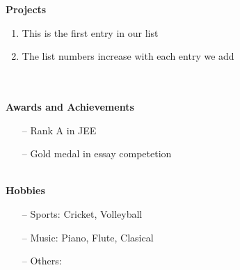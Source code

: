 \documentclass{article}
\begin{document}
\noindent \hspace*{1mm} \textbf{Projects} 
\begin{enumerate}
  \item This is the first entry in our list \lipsum[50]
  \item The list numbers increase with each entry we add \lipsum[50]
\end{enumerate}\\\\ 
\hspace*{1mm}\textbf{Awards and Achievements}
\begin{enumerate}
  \item[--] Rank A in JEE
  \item[--] Gold medal in essay competetion
\end{enumerate}\\
\hspace*{1mm}\textbf{Hobbies}
\begin{enumerate}
  \item[--] Sports: Cricket, Volleyball
  \item[--] Music: Piano, Flute, Clasical
  \item[--] Others:
\end{enumerate}\\
\end{document}
